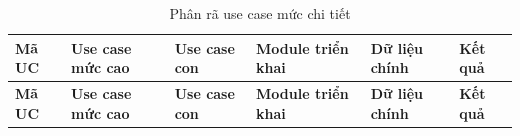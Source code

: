 \begin{longtable}{|
>{\RaggedRight\arraybackslash}p{0.9cm}|
>{\RaggedRight\arraybackslash}p{1.8cm}|
>{\RaggedRight\arraybackslash}p{2.3cm}|
>{\RaggedRight\arraybackslash}p{2.7cm}|
>{\RaggedRight\arraybackslash}p{2.2cm}|
>{\RaggedRight\arraybackslash}p{3.0cm}|}
\caption{Phân rã use case mức chi tiết}
\label{tab:phan-ra-usecase-chi-tiet} \\

\hline
\textbf{Mã UC} &
\textbf{Use case mức cao} &
\textbf{Use case con} &
\textbf{Module triển khai} &
\textbf{Dữ liệu chính} &
\textbf{Kết quả} \\
\hline
\endfirsthead

\hline
\textbf{Mã UC} &
\textbf{Use case mức cao} &
\textbf{Use case con} &
\textbf{Module triển khai} &
\textbf{Dữ liệu chính} &
\textbf{Kết quả} \\
\hline
\endhead


\end{longtable}
